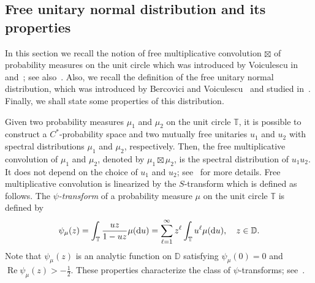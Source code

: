 \documentclass[10pt]{amsart}
\theoremstyle{definition}\newtheorem{defi}[theo]{Definition}\newtheorem{rema}[theo]{Remark}\newtheorem{exam}[theo]{Example}\newtheorem{exem}[theo]{Example}\newtheorem{nota}[theo]{Notation}
\DeclareMathOperator{\Ree}{Re}
\newcommand{\bT}{\mathbb{T}}
\newcommand{\bD}{\mathbb{D}}
\newcommand*\dint{\text{\normalfont d}}
\begin{document}
\subsection{Free unitary normal distribution and its properties}\label{sec:free_unitary_normal}


In this section we recall the notion of free multiplicative convolution $\boxtimes$ of probability measures on the unit circle which was introduced by Voiculescu in~\cite{voiculescu_symmetries} and~\cite{voiculescu_multiplication}; see also~\cite[\S 3.6]{voiculescu_nica_dykema_book}. Also, we recall the definition of the free unitary normal distribution, which was introduced by Bercovici and Voiculescu~\cite{bercovici_voiculescu_levy_hincin} and studied in~\cite{biane,biane_segal_bargmann,cebron,
zhong_free_brownian,zhong_free_normal}. Finally, we shall state some properties of this distribution.

Given two probability measures $\mu_1$ and $\mu_2$ on the unit circle $\bT$, it is possible to construct a $C^*$-probability space and two mutually free unitaries $u_1$ and $u_2$ with spectral distributions $\mu_1$ and $\mu_2$, respectively. Then, the free multiplicative convolution of $\mu_1$ and $\mu_2$, denoted by $\mu_1 \boxtimes \mu_2$, is the spectral distribution of $u_1 u_2$. It does not depend on the choice of $u_1$ and $u_2$; see~\cite{voiculescu_nica_dykema_book} for more details. Free multiplicative convolution is linearized by the $S$-transform which is defined as follows. The \emph{$\psi$-transform} of a probability measure $\mu$ on the unit circle $\bT$ is defined by
\begin{equation}\label{eq:psi_trafo_def}
\psi_{\mu}(z) =
\int_\bT \frac{uz}{1-uz} \mu(\dint u) = \sum_{\ell=1}^\infty z^\ell \int_{\bT} u^\ell \mu(\dint u),
\quad z\in \bD.
\end{equation}
Note that $\psi_\mu(z)$ is an analytic function on $\bD$ satisfying $\psi_\mu(0) = 0$ and $\Ree \psi_\mu(z) > - \frac 12$. These properties characterize the class of $\psi$-transforms; see~\cite[Lemma~2.9]{franz_hasebe_schleissinger_monotone}.
\end{document}
